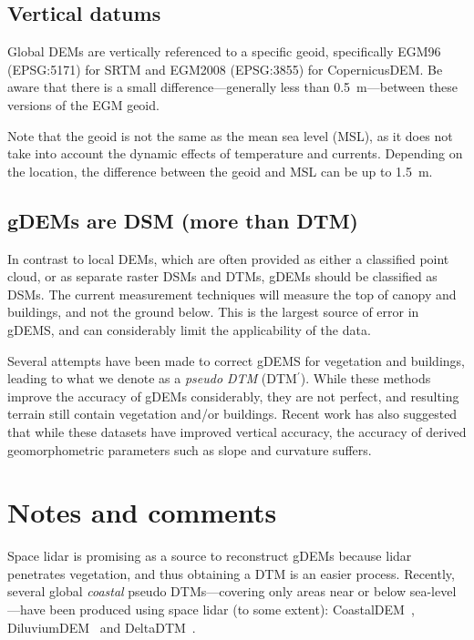 \subsection{Vertical datums}

Global DEMs are vertically referenced to a specific geoid, specifically EGM96 (EPSG:5171) for SRTM and EGM2008 (EPSG:3855) for CopernicusDEM\@.%
Be aware that there is a small difference---generally less than \qty{0.5}{m}---between these versions of the EGM geoid.

Note that the geoid is not the same as the mean sea level (MSL),%
as it does not take into account the dynamic effects of temperature and currents.
Depending on the location, the difference between the geoid and MSL can be up to \qty{1.5}{m}.


\subsection{gDEMs are DSM (more than DTM)}

In contrast to local DEMs, which are often provided as either a classified point cloud, or as separate raster DSMs and DTMs, gDEMs should be classified as DSMs.
The current measurement techniques will measure the top of canopy and buildings, and not the ground below.
This is the largest source of error in gDEMS, and can considerably limit the applicability of the data.

%

Several attempts have been made to correct gDEMS for vegetation and buildings, leading to what we denote as a \emph{pseudo DTM} (DTM$^{\prime}$).
While these methods improve the accuracy of gDEMs considerably, they are not perfect, and resulting terrain still contain vegetation and/or buildings.
Recent work has also suggested that while these datasets have improved vertical accuracy, the accuracy of derived geomorphometric parameters such as slope and curvature suffers.


%
\section{Notes and comments}


Space lidar is promising as a source to reconstruct gDEMs because lidar penetrates vegetation, and thus obtaining a DTM is an easier process.
Recently, several global \emph{coastal} pseudo DTMs---covering only areas near or below sea-level---have been produced using space lidar (to some extent): CoastalDEM~\citep{Kulp24}, DiluviumDEM~\citep{Dusseau23} and DeltaDTM~\citep{Pronk24}.

